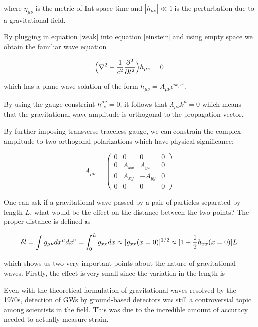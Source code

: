\documentclass[oneside]{book}
\begin{document}
	where $\eta_{\mu \nu}$ is the metric of flat space time and $|h_{\mu \nu}| \ll 1$ is the perturbation due to a gravitational field.
	
	By plugging in equation \ref{weak} into equation \ref{einstein} and using empty space we obtain the familiar wave equation
	
	\begin{equation} \label{wave}
	\Big(\nabla^2 - \frac{1}{c^2} \pdv[2]{t} \Big) h_{\mu \nu}  = 0
	\end{equation}

	which has a plane-wave solution of the form $h_{\mu \nu} = A_{\mu \nu} e^{ik_{\nu} x^{\nu}}$. 
	
	By using the gauge constraint $h^{\mu \nu}_{,\nu} = 0$, it follows that $A_{\mu \nu} k^{\mu} = 0$ which means that the gravitational wave amplitude is orthogonal to the propagation vector.
	
	By further imposing transverse-traceless gauge, we can constrain the complex amplitude to two orthogonal polarizations which have physical significance:
	
	\begin{equation} \label{gwamp}
	A_{\mu \nu} = 
	\begin{pmatrix}
			0 &    0   &  0      & 0 
		 \\ 0 & A_{xx} &  A_{yx} & 0
		 \\ 0 & A_{xy} & -A_{yy} & 0
		 \\ 0 &    0   &  0      & 0
	\end{pmatrix}
	\end{equation}

	One can ask if a gravitational wave passed by a pair of particles separated by length $L$, what would be the effect on the distance between the two points?  The proper distance is defined as
	
	\begin{equation}\label{propdist}
	\delta l
	= \int{g_{\mu \nu} dx^{\mu} dx^{\nu}} \\
	= \int_{0}^{L}{g_{xx} {d}x}\\
	\approx |g_{xx}(x=0)|^{1/2}\\
	\approx [ 1 + \frac{1}{2} h_{xx}(x=0)] L
	\end{equation} 
	
	which shows us two very important points about the nature of gravitational waves.  Firstly, the effect is very small since the variation in the length is 
	
	Even with the theoretical formulation of gravitational waves resolved by the 1970s, detection of GWs by ground-based detectors was still a controversial topic among scientists in the field.  This was due to the incredible amount of accuracy needed to actually measure strain. 
	
\end{document}
